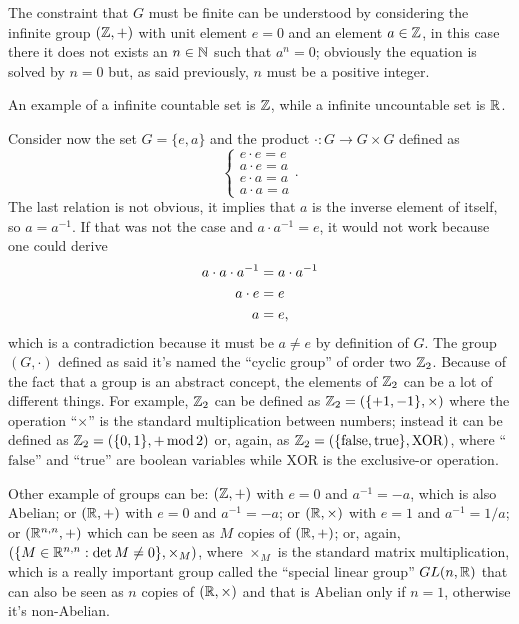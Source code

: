 The constraint that $G$ must be finite can be understood by considering the infinite group $(\mathbb{Z},+)$ with unit element $e =0$ and an element $a \in \mathbb{Z}$, in this case there it does not exists an $n \in \mathbb{N}$ such that $a^n = 0$; obviously the equation is solved by $n = 0$ but, as said previously, $n$ must be a positive integer.
\begin{ex}
    An example of a infinite countable set is $\mathbb{Z}$, while a infinite uncountable set is $\mathbb{R}$.
\end{ex}
Consider now the set $G = \{e,a\}$ and the product $\cdot : G \to G \times G$ defined as
\begin{equation}
    \begin{cases}
        e \cdot e = e \\
        a \cdot e = a \\
        e \cdot a = a \\
        a \cdot a = a
    \end{cases}.
\end{equation}
The last relation is not obvious, it implies that $a$ is the inverse element of itself, so $a = a^{-1}$. If that was not the case and $a \cdot a^{-1} = e$, it would not work because one could derive 
\begin{align}
    a \cdot a \cdot a^{-1} &= a \cdot a^{-1} \notag \\
    a \cdot e &= e \\
    a &= e, \notag
\end{align}
which is a contradiction because it must be $a \neq e$ by definition of $G$. The group $(G,\cdot)$ defined as said it's named the ``cyclic group'' of order two $\mathbb{Z}_2$. Because of the fact that a group is an abstract concept, the elements of $\mathbb{Z}_2$ can be a lot of different things. For example, $\mathbb{Z}_2$ can be defined as $\mathbb{Z}_2 = (\{+1,-1\},\times)$ where the operation ``$\times$'' is the standard multiplication between numbers; instead it can be defined as $\mathbb{Z}_2 = (\{0,1\},+\,\mathrm{mod}\, 2)$ or, again, as $\mathbb{Z}_2 = (\{\mathrm{false},\mathrm{true}\},\mathrm{XOR})$, where ``$\mathrm{false}$'' and ``$\mathrm{true}$'' are boolean variables while $\mathrm{XOR}$ is the exclusive-or operation.
\begin{ex}
    Other example of groups can be: $(\mathbb{Z},+)$ with $e = 0$ and $a^{-1} = -a$, which is also Abelian; or $(\mathbb{R},+)$ with $e = 0$ and $a^{-1} = -a$; or $(\mathbb{R},\times)$ with $e = 1$ and $a^{-1} = 1/a$; or $(\mathbb{R}^{n,n},+)$ which can be seen as $M$ copies of $(\mathbb{R},+)$; or, again, $(\{ M\in \mathbb{R}^{n,n} : \det{M} \neq 0\}, \times_M)$, where $\times_M$ is the standard matrix multiplication, which is a really important group called the ``special linear group'' $GL(n,\mathbb{R})$ that can also be seen as $n$ copies of $(\mathbb{R},\times)$ and that is Abelian only if $n = 1$, otherwise it's non-Abelian. 
\end{ex}

